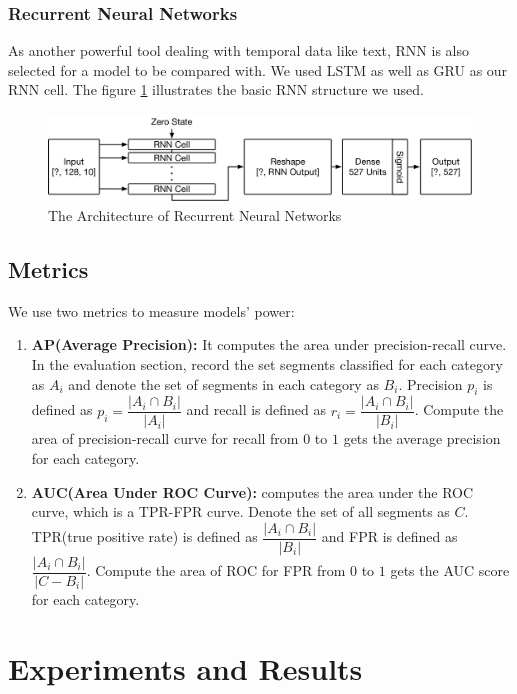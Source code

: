 \documentclass{article}
\begin{document}
			\subsubsection*{Recurrent Neural Networks}
				As another powerful tool dealing with temporal data like text, RNN is also selected for a model to be compared with. We used LSTM as well as GRU as our RNN cell. The figure \ref{fig:rnn-arch} illustrates the basic RNN structure we used.
				\begin{figure}[htbp]
					\centering
					\includegraphics[width=13cm]{figures/rnn-arch.pdf}
					\caption{\label{fig:rnn-arch}The Architecture of Recurrent Neural Networks}
				\end{figure}

		\subsection{Metrics}
			We use two metrics to measure models' power:
			\begin{enumerate}
				\item \textbf{AP(Average Precision):} It computes the area under precision-recall curve. In the evaluation section, record the set segments classified for each category as $A_i$ and denote the set of segments in each category as $B_i$. Precision $p_i$ is defined as $p_i = \dfrac{|A_i \cap B_i|}{|A_i|}$ and recall is defined as $r_i = \dfrac{|A_i \cap B_i|}{|B_i|}$. Compute the area of precision-recall curve for recall from $0$ to $1$ gets the average precision for each category.
				\item \textbf{AUC(Area Under ROC Curve):} computes the area under the ROC curve, which is a TPR-FPR curve. Denote the set of all segments as $C$. TPR(true positive rate) is defined as $\dfrac{|A_i \cap B_i|}{|B_i|}$ and FPR is defined as $\dfrac{|A_i \cap B_i|}{|C - B_i|}$. Compute the area of ROC for FPR from $0$ to $1$ gets the AUC score for each category.
			\end{enumerate}

	\section{Experiments and Results}\label{sec:exps}
\end{document}

